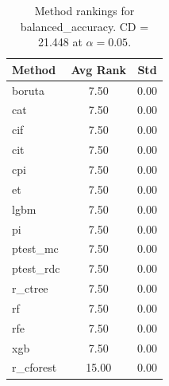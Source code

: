 \begin{table}[h]
\centering
\caption{Method rankings for balanced_accuracy. CD = 21.448 at $\alpha=0.05$.}
\label{tab:ranks_balanced_accuracy}
\begin{tabular}{lcc}
\toprule
Method & Avg Rank & Std \\
\midrule
boruta & 7.50 & 0.00 \\
cat & 7.50 & 0.00 \\
cif & 7.50 & 0.00 \\
cit & 7.50 & 0.00 \\
cpi & 7.50 & 0.00 \\
et & 7.50 & 0.00 \\
lgbm & 7.50 & 0.00 \\
pi & 7.50 & 0.00 \\
ptest_mc & 7.50 & 0.00 \\
ptest_rdc & 7.50 & 0.00 \\
r_ctree & 7.50 & 0.00 \\
rf & 7.50 & 0.00 \\
rfe & 7.50 & 0.00 \\
xgb & 7.50 & 0.00 \\
r_cforest & 15.00 & 0.00 \\
\bottomrule
\end{tabular}
\end{table}